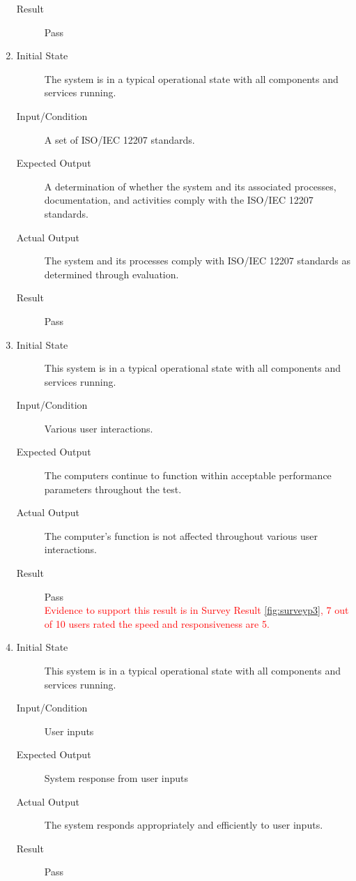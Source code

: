 \documentclass[12pt, titlepage]{article}
\newcommand{\rt}[1]{\textcolor{red}{#1}}
\begin{document}
\begin{enumerate}[NFR-T1]
\begin{description}
    \item[Result] Pass
    \end{description}
  \item \label{NFRT28}
    \begin{description}
    \item[Initial State] The system is in a typical operational state with all
      components and services running.
    \item[Input/Condition] A set of ISO/IEC 12207 standards.
    \item[Expected Output] A determination of whether the system and its associated
      processes, documentation, and activities comply with the ISO/IEC 12207
      standards.
    \item[Actual Output] The system and its processes comply with ISO/IEC 12207
      standards as determined through evaluation.
    \item[Result] Pass
    \end{description}
  \item \label{NFRT29}
    \begin{description}
    \item[Initial State] This system is in a typical operational state with all
      components and services running.
    \item[Input/Condition] Various user interactions.
    \item[Expected Output] The computers continue to function within acceptable
      performance parameters throughout the test.
    \item[Actual Output] The computer's function is not affected throughout various
      user interactions.
    \item[Result] Pass \\
    \rt{ Evidence to support this result is in Survey Result \ref{fig:surveyp3}, 7 out of 10 users rated the speed and responsiveness are 5. }
    \end{description}
  \item \label{NFRT30}
    \begin{description}
    \item[Initial State] This system is in a typical operational state with all
      components and services running.
    \item[Input/Condition] User inputs
    \item[Expected Output] System response from user inputs
    \item[Actual Output] The system responds appropriately and efficiently to user
      inputs.
    \item[Result] Pass
    \end{description}
  \end{enumerate}
\end{document}

